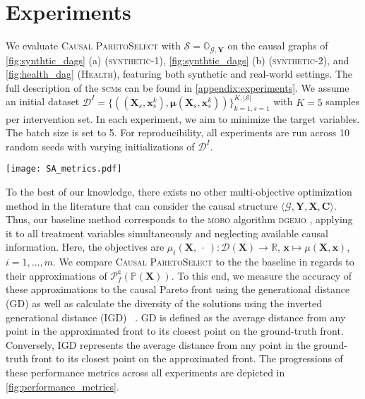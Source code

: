 \section{Experiments}

We evaluate \textsc{Causal ParetoSelect} with $\mathcal{S} = \mathbb{O}_{\mathcal{G},\mathbf{Y}}$ on the causal graphs of \cref{fig:synthtic_dags} (a) (\textsc{synthetic-1}), \cref{fig:synthtic_dags} (b) (\textsc{synthetic-2}), and \cref{fig:health_dag} (\textsc{Health}), featuring both synthetic and real-world settings. The full description of the \textsc{scm}s can be found in \cref{appendix:experiments}. We assume an initial dataset $\mathcal{D}^{I} = \{ ((\mathbf{X}_s, \mathbf{x}_s^k), \boldsymbol{\mu}(\mathbf{X}_s, \mathbf{x}_s^k)) \}_{k=1,s=1}^{K,|\mathcal{S}|}$ with $K=5$ samples per intervention set. In each experiment, we aim to minimize the target variables. The batch size is set to \num{5}. For reproducibility, all experiments are run across 10 random seeds with varying initializations of $\mathcal{D}^{I}$. 

\begin{figure*}[t]
\vspace{-1cm}
\hspace{-0.6cm}
\texttt{[image: SA\_metrics.pdf]}
\vspace{-1.7cm}
\caption{Convergence to the causal Pareto front across all experiments, measured by the generational distance (upper row) and inverted generational distance (lower row). Lower values indicate better approximations of the ground-truth. The number of interventions refers to the count of intervention variables that were intervened upon. Shaded areas represent $\pm$ standard deviation across \num{10} random seeds.
}
\label{fig:performance_metrics}
\end{figure*}

To the best of our knowledge, there exists no other multi-objective optimization method in the literature that can consider the causal structure $\langle \mathcal{G}, \mathbf{Y}, \mathbf{X}, \mathbf{C} \rangle$. 
Thus, our baseline method corresponds to the \textsc{mobo} algorithm \textsc{dgemo} \citep{dgemo}, applying it to all treatment variables simultaneously and neglecting available causal information.
Here, the objectives are $\mu_i(\mathbf{X}, \ \cdot \ ): \mathcal{D}(\mathbf{X}) \rightarrow \mathbb{R}$, $\mathbf{x} \mapsto \mu(\mathbf{X},\mathbf{x})$, $i=1,\dots,m$. 
We compare \textsc{Causal ParetoSelect} to the the baseline in regards to their approximations of $\mathcal{P}_f^{\textsf{c}}(\mathbb{P}(\mathbf{X}))$. 
To this end, we measure the accuracy of these approximations to the causal Pareto front using the generational distance (GD) as well as calculate the diversity of the solutions using the inverted generational distance (IGD) ~\cite{gd}.  
GD is defined as the average distance from any point in the approximated front to its closest point on the ground-truth front. Conversely,  IGD represents the average distance from any point in the ground-truth front to its closest point on the approximated front. 
The progressions of these performance metrics across all experiments are depicted in \cref{fig:performance_metrics}.


